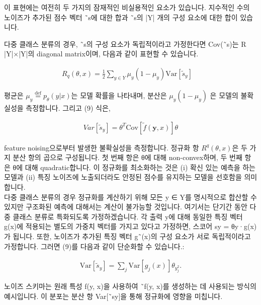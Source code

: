 \documentclass{article}
\begin{document}
이 표현에는 여전히 두 가지의 잠재적인 비실용적인 요소가 있습니다. 지수적인 수의 노이즈가 추가된 점수 벡터 ˜s에 대한 합과 ˜s의 |Y| 개의 구성 요소에 대한 합이 있습니다.

다중 클래스 분류의 경우, ˜s의 구성 요소가 독립적이라고 가정한다면 Cov(˜s)는 R |Y|×|Y|의 diagonal matrix이며, 다음과 같이 표현할 수 있습니다.

\begin{align}
R_q(\theta, x) = \frac{1}{2} \sum_{y \in Y} \mu_y(1 - \mu_y) \text{Var}[\tilde{s}_y] \quad
\end{align}

평균은 $\mu_y \stackrel{\text{def}}{=} p_{\theta}(y \vert x)$는 모델 확률을 나타내며, 분산은 $\mu_y(1-\mu_y)$ 은 모델의 불확실성을 측정합니다. 그리고 (9) 식은,

\begin{align}
    Var[\tilde{s}_y] = \theta^T \text{Cov}[\tilde{f}(\textbf{y}, x)]\theta
\end{align}

feature noising으로부터 발생한 불확실성을 측정합니다. 정규화 항 $R^q(θ, x)$은 두 가지 분산 항의 곱으로 구성됩니다. 첫 번째 항은 θ에 대해 non-convex하며, 두 번째 항은 θ에 대해 quadratic합니다. 이 정규화를 최소화하는 것은 (i) 확신 있는 예측을 하는 모델과 (ii) 특징 노이즈에 노출되더라도 안정된 점수를 유지하는 모델을 선호함을 의미합니다.\\

다중 클래스 분류의 경우 정규화를 계산하기 위해 모든 y ∈ Y를 명시적으로 합산할 수 있지만 구조화된 예측에 대해서는 계산이 불가능할 것입니다. 여기서는 단기간 동안 다중 클래스 분류로 특화되도록 가정하겠습니다. 각 출력 y에 대해 동일한 특징 벡터 g(x)에 적용되는 별도의 가중치 벡터를 가지고 있다고 가정하면, 스코어 sy = θy·g(x)가 됩니다. 또한, 노이즈가 추가된 특징 벡터 g˜(x)의 구성 요소가 서로 독립적이라고 가정합니다. 그러면 (9)를 다음과 같이 단순화할 수 있습니다.:

\begin{align}
    \text{Var}[\tilde{s}_y] = \sum_j \text{Var}[g_j(x)]\theta_y_j^2.
\end{align}

노이즈 스키마는 원래 특성 f(y, x)을 사용하여 ˜f(y, x)를 생성하는 데 사용되는 방식의 예시입니다. 이 분포는 분산 항 Var[˜sy]을 통해 정규화에 영향을 미칩니다.
\end{document}
